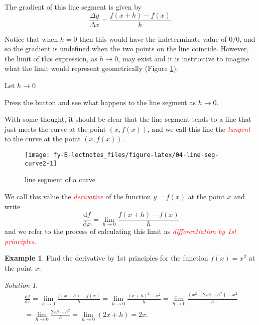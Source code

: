 \documentclass[
  11pt,
  oneside]{book}
\newcommand{\slide}{}
\theoremstyle{definition}
\theoremstyle{definition}
\newtheorem{example}{Example}[chapter]
\theoremstyle{definition}
\theoremstyle{definition}
\theoremstyle{remark}
\newtheorem*{solution}{Solution}
\begin{document}
The gradient of this line segment is given by
\[
\frac{\Delta y}{\Delta x} = \frac{f(x+h)-f(x)}{h}.
\]
\slide

Notice that when \(h=0\) then this would have the indeterminate value of \(0/0\), and so the gradient is undefined when the two points on the line coincide. However, the limit of this expression, as \(h\to0\), may exist and it is instructive to imagine what the limit would represent geometrically (Figure \ref{fig:04-line-seg-curve2}):

\begin{htmlonly}

\label{div_head}
Let \(h\to 0\)

\label{div_body}

Press the button and see what happens to the line segment as \(h\to0\).

\end{htmlonly}

With some thought, it should be clear that the line segment tends to a line that just meets the curve at the point \((x,f(x))\), and we call this line the \textcolor{red}{\em tangent} to the curve at the point \((x,f(x))\).

\begin{figure}

{\centering \texttt{[image: fy-B-lectnotes\_files/figure-latex/04-line-seg-curve2-1]} 

}

\caption{line segment of a curve}\label{fig:04-line-seg-curve2}
\end{figure}

\slide

We call this value the \textcolor{red}{\em derivative} of the function \(y=f(x)\) at the point \(x\) and write
\[
\frac{\mathrm{d} f}{\mathrm{d} x} = \lim\limits_{h\to0}\frac{f(x+h)-f(x)}{h}
\]
and we refer to the process of calculating this limit as \textcolor{red}{\em differentiation by 1st principles}.

\slide

\begin{example}
Find the derivative by 1st principles for the function \(f(x) = x^2\) at the point \(x\).
\end{example}

\begin{solution}
\begin{gather*}
\frac{\mathrm{d} f}{\mathrm{d} x} = \lim\limits_{h\to0}\frac{f(x+h)-f(x)}{h} = \lim\limits_{h\to0}\frac{(x+h)^2 - x^2}{h} = \lim\limits_{h\to0}\frac{(x^2+2xh+h^2)-x^2}{h}\\ = \lim\limits_{h\to0}\frac{2xh+h^2}{h} = \lim\limits_{h\to0}(2x+h) = 2x.
\end{gather*}
\end{solution}
\end{document}
